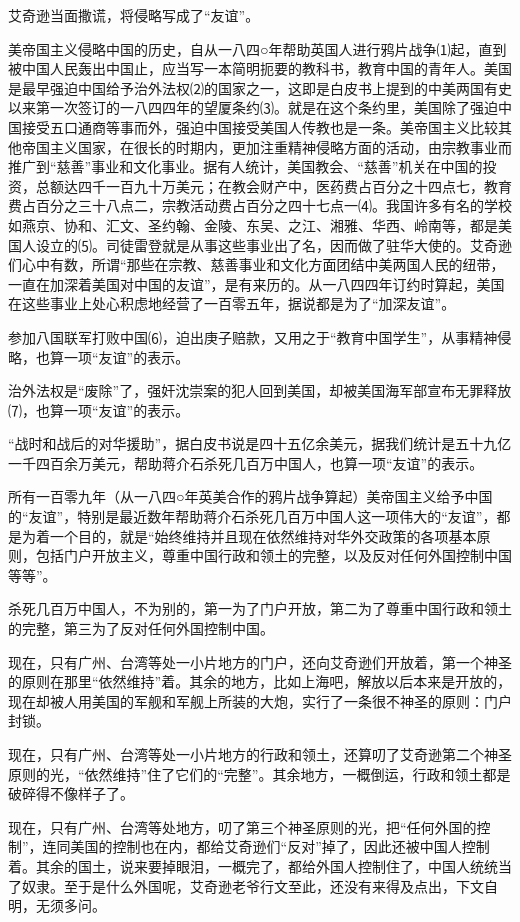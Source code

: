 \documentclass[UTF-8, a5paper, 12pt]{ctexart}
\begin{document}
艾奇逊当面撒谎，将侵略写成了“友谊”。

美帝国主义侵略中国的历史，自从一八四○年帮助英国人进行鸦片战争⑴起，直到被中国人民轰出中国止，应当写一本简明扼要的教科书，教育中国的青年人。美国是最早强迫中国给予治外法权⑵的国家之一，这即是白皮书上提到的中美两国有史以来第一次签订的一八四四年的望厦条约⑶。就是在这个条约里，美国除了强迫中国接受五口通商等事而外，强迫中国接受美国人传教也是一条。美帝国主义比较其他帝国主义国家，在很长的时期内，更加注重精神侵略方面的活动，由宗教事业而推广到“慈善”事业和文化事业。据有人统计，美国教会、“慈善”机关在中国的投资，总额达四千一百九十万美元；在教会财产中，医药费占百分之十四点七，教育费占百分之三十八点二，宗教活动费占百分之四十七点一⑷。我国许多有名的学校如燕京、协和、汇文、圣约翰、金陵、东吴、之江、湘雅、华西、岭南等，都是美国人设立的⑸。司徒雷登就是从事这些事业出了名，因而做了驻华大使的。艾奇逊们心中有数，所谓“那些在宗教、慈善事业和文化方面团结中美两国人民的纽带，一直在加深着美国对中国的友谊”，是有来历的。从一八四四年订约时算起，美国在这些事业上处心积虑地经营了一百零五年，据说都是为了“加深友谊”。

参加八国联军打败中国⑹，迫出庚子赔款，又用之于“教育中国学生”，从事精神侵略，也算一项“友谊”的表示。

治外法权是“废除”了，强奸沈崇案的犯人回到美国，却被美国海军部宣布无罪释放⑺，也算一项“友谊”的表示。

“战时和战后的对华援助”，据白皮书说是四十五亿余美元，据我们统计是五十九亿一千四百余万美元，帮助蒋介石杀死几百万中国人，也算一项“友谊”的表示。

所有一百零九年（从一八四○年英美合作的鸦片战争算起）美帝国主义给予中国的“友谊”，特别是最近数年帮助蒋介石杀死几百万中国人这一项伟大的“友谊”，都是为着一个目的，就是“始终维持并且现在依然维持对华外交政策的各项基本原则，包括门户开放主义，尊重中国行政和领土的完整，以及反对任何外国控制中国等等”。

杀死几百万中国人，不为别的，第一为了门户开放，第二为了尊重中国行政和领土的完整，第三为了反对任何外国控制中国。

现在，只有广州、台湾等处一小片地方的门户，还向艾奇逊们开放着，第一个神圣的原则在那里“依然维持”着。其余的地方，比如上海吧，解放以后本来是开放的，现在却被人用美国的军舰和军舰上所装的大炮，实行了一条很不神圣的原则：门户封锁。

现在，只有广州、台湾等处一小片地方的行政和领土，还算叨了艾奇逊第二个神圣原则的光，“依然维持”住了它们的“完整”。其余地方，一概倒运，行政和领土都是破碎得不像样子了。

现在，只有广州、台湾等处地方，叨了第三个神圣原则的光，把“任何外国的控制”，连同美国的控制也在内，都给艾奇逊们“反对”掉了，因此还被中国人控制着。其余的国土，说来要掉眼泪，一概完了，都给外国人控制住了，中国人统统当了奴隶。至于是什么外国呢，艾奇逊老爷行文至此，还没有来得及点出，下文自明，无须多问。
\end{document}

